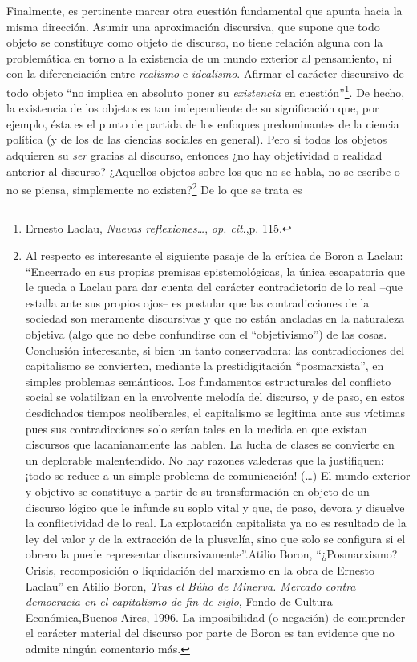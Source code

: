 Finalmente, es pertinente marcar otra cuestión fundamental que apunta
hacia la misma dirección. Asumir una aproximación discursiva, que supone
que todo objeto se constituye como objeto de discurso, no tiene relación
alguna con la problemática en torno a la existencia de un mundo exterior
al pensamiento, ni con la diferenciación entre \emph{realismo} e
\emph{idealismo}. Afirmar el carácter discursivo de todo objeto \enquote{no
implica en absoluto poner su \emph{existencia} en cuestión}\footnote{Ernesto
  Laclau, \emph{Nuevas reflexiones\ldots{}}, \emph{op. cit}.,p. 115.}.
De hecho, la existencia de los objetos es tan independiente de su
significación que, por ejemplo, ésta es el punto de partida de los
enfoques predominantes de la ciencia política (y de los de las ciencias
sociales en general). Pero si todos los objetos adquieren su \emph{ser}
gracias al discurso, entonces ¿no hay objetividad o realidad anterior al
discurso? ¿Aquellos objetos sobre los que no se habla, no se escribe o
no se piensa, simplemente no existen?\footnote{Al respecto es
  interesante el siguiente pasaje de la crítica de Boron a Laclau:
  \enquote{Encerrado en sus propias premisas epistemológicas, la única
  escapatoria que le queda a Laclau para dar cuenta del carácter
  contradictorio de lo real --que estalla ante sus propios ojos-- es
  postular que las contradicciones de la sociedad son meramente
  discursivas y que no están ancladas en la naturaleza objetiva (algo
  que no debe confundirse con el ``objetivismo'') de las cosas.
  Conclusión interesante, si bien un tanto conservadora: las
  contradicciones del capitalismo se convierten, mediante la
  prestidigitación ``posmarxista'', en simples problemas semánticos. Los
  fundamentos estructurales del conflicto social se volatilizan en la
  envolvente melodía del discurso, y de paso, en estos desdichados
  tiempos neoliberales, el capitalismo se legitima ante sus víctimas
  pues sus contradicciones solo serían tales en la medida en que existan
  discursos que lacanianamente las hablen. La lucha de clases se
  convierte en un deplorable malentendido. No hay razones valederas que
  la justifiquen: ¡todo se reduce a un simple problema de comunicación!
  (\dots) El mundo exterior y objetivo se constituye a partir de su
  transformación en objeto de un discurso lógico que le infunde su soplo
  vital y que, de paso, devora y disuelve la conflictividad de lo real.
  La explotación capitalista ya no es resultado de la ley del valor y de
  la extracción de la plusvalía, sino que solo se configura si el obrero
  la puede representar discursivamente}.Atilio Boron, \enquote{¿Posmarxismo?
  Crisis, recomposición o liquidación del marxismo en la obra de Ernesto
  Laclau} en Atilio Boron, \emph{Tras el Búho de Minerva. Mercado contra
  democracia en el capitalismo de fin de siglo}, Fondo de Cultura
  Económica,Buenos Aires, 1996. La imposibilidad (o negación) de
  comprender el carácter material del discurso por parte de Boron es tan
  evidente que no admite ningún comentario más.} De lo que se trata es
